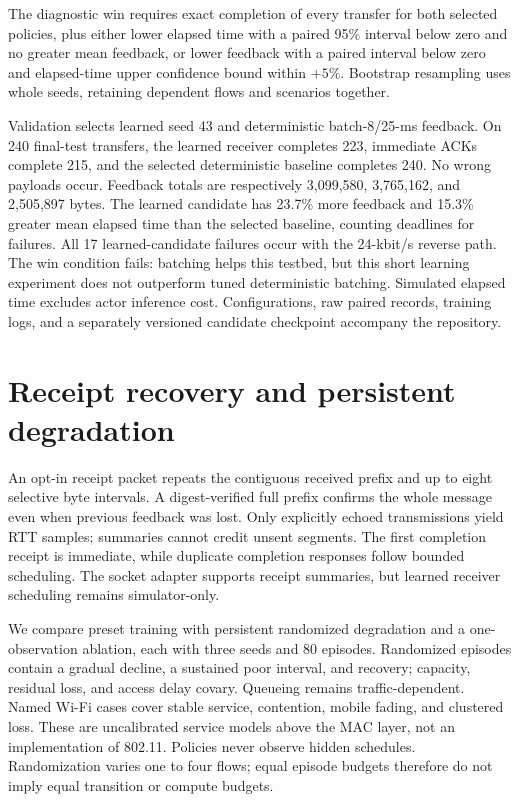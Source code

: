 \documentclass[11pt]{article}
\begin{document}
The diagnostic win requires exact completion of every transfer for both selected
policies, plus either lower elapsed time with a paired 95\% interval below zero
and no greater mean feedback, or lower feedback with a paired interval below
zero and elapsed-time upper confidence bound within $+5\%$. Bootstrap resampling
uses whole seeds, retaining dependent flows and scenarios together.

Validation selects learned seed 43 and deterministic batch-8/25-ms feedback.
On 240 final-test transfers, the learned receiver completes 223, immediate ACKs
complete 215, and the selected deterministic baseline completes 240. No wrong
payloads occur. Feedback totals are respectively 3,099,580, 3,765,162, and
2,505,897 bytes. The learned candidate has 23.7\% more feedback and 15.3\% greater
mean elapsed time than the selected baseline, counting deadlines for failures.
All 17 learned-candidate failures occur with the 24-kbit/s reverse path.
The win condition fails: batching helps this testbed, but this short learning
experiment does not outperform tuned deterministic batching. Simulated elapsed
time excludes actor inference cost. Configurations, raw paired records, training
logs, and a separately versioned candidate checkpoint accompany the repository.

\section{Receipt recovery and persistent degradation}
An opt-in receipt packet repeats the contiguous received prefix and up to eight
selective byte intervals. A digest-verified full prefix confirms the whole
message even when previous feedback was lost. Only explicitly echoed
transmissions yield RTT samples; summaries cannot credit unsent segments.
The first completion receipt is immediate, while duplicate completion responses
follow bounded scheduling. The socket adapter supports receipt summaries, but
learned receiver scheduling remains simulator-only.

We compare preset training with persistent randomized degradation and a
one-observation ablation, each with three seeds and 80 episodes. Randomized
episodes contain a gradual decline, a sustained poor interval, and recovery;
capacity, residual loss, and access delay covary. Queueing remains
traffic-dependent. Named Wi-Fi cases cover stable service, contention, mobile
fading, and clustered loss. These are uncalibrated service models above the MAC
layer, not an implementation of 802.11. Policies never observe hidden schedules.
Randomization varies one to four flows; equal episode budgets therefore do not
imply equal transition or compute budgets.
\end{document}

